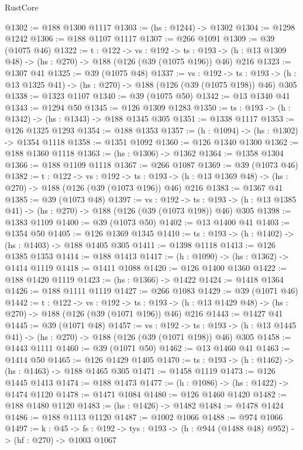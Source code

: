 \begin{lexlean}{RustCore}
\begin{coremodule}
@1302 := @188 @1300 @1117
@1303 := (hs : @1244) -> @1302
@1304 := @1298 @1242
@1306 := @188 @1107 @1117
@1307 := @266 @1091
@1309 := @39 (@1075 @46)
@1322 := {t : @122} ->
  {vs : @192} ->
  {ts : @193} -> (h : @13 @1309 @48) -> (hs : @270) -> @188 (@126 (@39 (@1075 @196)) @46) @216
@1323 := @1307 @41
@1325 := @39 (@1075 @48)
@1337 := {vs : @192} ->
  {ts : @193} -> (h : @13 @1325 @41) -> (hs : @270) -> @188 (@126 (@39 (@1075 @198)) @46) @305
@1338 := @1323 @1107
@1340 := @39 (@1075 @50)
@1342 := @13 @1340 @41
@1343 := @1294 @50
@1345 := @126 @1309 @1283
@1350 := {ts : @193} -> (h : @1342) -> (hs : @1343) -> @188 @1345 @305
@1351 := @1338 @1117
@1353 := @126 @1325 @1293
@1354 := @188 @1353
@1357 := (h : @1094) -> (hs : @1302) -> @1354 @1118
@1358 := @1351 @1092
@1360 := @126 @1340 @1300
@1362 := @188 @1360 @1118
@1363 := (hs : @1306) -> @1362
@1364 := @1358 @1304
@1366 := @188 @1109 @1118
@1367 := @266 @1087
@1369 := @39 (@1073 @46)
@1382 := {t : @122} ->
  {vs : @192} ->
  {ts : @193} -> (h : @13 @1369 @48) -> (hs : @270) -> @188 (@126 (@39 (@1073 @196)) @46) @216
@1383 := @1367 @41
@1385 := @39 (@1073 @48)
@1397 := {vs : @192} ->
  {ts : @193} -> (h : @13 @1385 @41) -> (hs : @270) -> @188 (@126 (@39 (@1073 @198)) @46) @305
@1398 := @1383 @1109
@1400 := @39 (@1073 @50)
@1402 := @13 @1400 @41
@1403 := @1354 @50
@1405 := @126 @1369 @1345
@1410 := {ts : @193} -> (h : @1402) -> (hs : @1403) -> @188 @1405 @305
@1411 := @1398 @1118
@1413 := @126 @1385 @1353
@1414 := @188 @1413
@1417 := (h : @1090) -> (hs : @1362) -> @1414 @1119
@1418 := @1411 @1088
@1420 := @126 @1400 @1360
@1422 := @188 @1420 @1119
@1423 := (hs : @1366) -> @1422
@1424 := @1418 @1364
@1426 := @188 @1111 @1119
@1427 := @266 @1083
@1429 := @39 (@1071 @46)
@1442 := {t : @122} ->
  {vs : @192} ->
  {ts : @193} -> (h : @13 @1429 @48) -> (hs : @270) -> @188 (@126 (@39 (@1071 @196)) @46) @216
@1443 := @1427 @41
@1445 := @39 (@1071 @48)
@1457 := {vs : @192} ->
  {ts : @193} -> (h : @13 @1445 @41) -> (hs : @270) -> @188 (@126 (@39 (@1071 @198)) @46) @305
@1458 := @1443 @1111
@1460 := @39 (@1071 @50)
@1462 := @13 @1460 @41
@1463 := @1414 @50
@1465 := @126 @1429 @1405
@1470 := {ts : @193} -> (h : @1462) -> (hs : @1463) -> @188 @1465 @305
@1471 := @1458 @1119
@1473 := @126 @1445 @1413
@1474 := @188 @1473
@1477 := (h : @1086) -> (hs : @1422) -> @1474 @1120
@1478 := @1471 @1084
@1480 := @126 @1460 @1420
@1482 := @188 @1480 @1120
@1483 := (hs : @1426) -> @1482
@1484 := @1478 @1424
@1486 := @188 @1113 @1120
@1487 := @1002 @1066
@1488 := @974 @1066
@1497 := {k : @45} ->
  {fs : @192} -> {tys : @193} -> (h : @944 (@1488 @48) @952) -> (hf : @270) -> @1003 @1067

\end{coremodule}
\end{lexlean}
